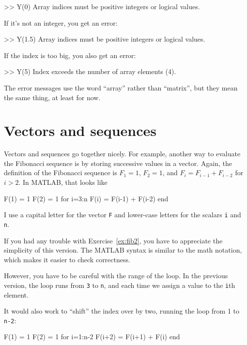 \documentclass[
]{book}
\numberwithin{Answer}{chapter}
\numberwithin{Exercise}{chapter}
\begin{document}
\begin{code}
>> Y(0)
Array indices must be positive integers or logical values.
\end{code}

If it's not an integer, you get an error:

\begin{code}
>> Y(1.5)
Array indices must be positive integers or logical values.
\end{code}

If the index is too big, you also get an error:

\begin{code}
>> Y(5)
Index exceeds the number of array elements (4).
\end{code}

The error messages use the word ``array'' rather than ``matrix'', but they mean the same thing, at least for now.


\section{Vectors and sequences}

Vectors and sequences go together nicely.
For example, another way to evaluate the Fibonacci sequence is by
storing successive values in a vector.  Again, the definition of the
Fibonacci sequence is $F_1 = 1$, $F_2 = 1$, and $F_{i} = F_{i-1} +
F_{i-2}$ for $i > 2$.  In MATLAB, that looks like

\begin{code}
F(1) = 1
F(2) = 1
for i=3:n
    F(i) = F(i-1) + F(i-2)
end
\end{code}

I use a capital letter for the vector {\tt F}
and lower-case letters for the scalars {\tt i} and {\tt n}.

If you had any trouble with Exercise~\ref{ex:fib2}, you have to
appreciate the simplicity of this version.  The MATLAB syntax is
similar to the math notation, which makes it easier to check
correctness.  

However, you have to be careful with the range of the loop.
In the previous version, the loop runs from {\tt 3} to {\tt n},
and each time we assign a value to the {\tt i}th element.  

It would also work to ``shift'' the index over by two,
running the loop from 1 to {\tt n-2}:

\begin{code}
F(1) = 1
F(2) = 1
for i=1:n-2
    F(i+2) = F(i+1) + F(i)
end
\end{code}
\end{document}
